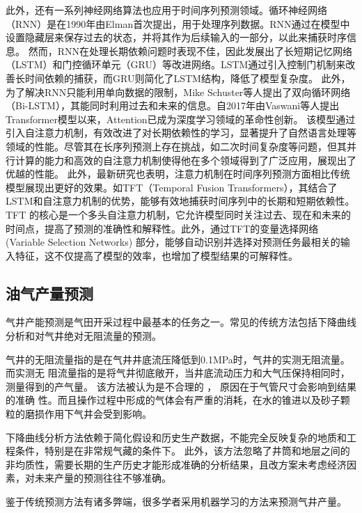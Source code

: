 此外，还有一系列神经网络算法也应用于时间序列预测领域。循环神经网络\cite{li2018independently}（RNN）是在1990年由Elman首次提出，用于处理序列数据。RNN通过在模型中设置隐藏层来保存过去的状态，并将其作为后续输入的一部分，以此来捕获时序信息。
然而，RNN在处理长期依赖问题时表现不佳，因此发展出了长短期记忆网络\cite{yu2019review}（LSTM）和门控循环单元\cite{dey2017gate}（GRU）等改进网络。LSTM通过引入控制门机制来改善长时间依赖的捕获，而GRU则简化了LSTM结构，降低了模型复杂度。
此外，为了解决RNN只能利用单向数据的限制，Mike Schuster等人提出了双向循环网络\cite{graves2005framewise}（Bi-LSTM），其能同时利用过去和未来的信息。自2017年由Vaswani等人提出Transformer模型\cite{vaswani2017attention}以来，Attention已成为深度学习领域的革命性创新。
该模型通过引入自注意力机制，有效改进了对长期依赖性的学习，显著提升了自然语言处理等领域的性能。尽管其在长序列预测上存在挑战，如二次时间复杂度等问题，但其并行计算的能力和高效的自注意力机制使得他在多个领域得到了广泛应用，展现出了优越的性能。
此外，最新研究也表明，注意力机制在时间序列预测方面相比传统模型展现出更好的效果。如TFT\cite{lim2021temporal}（Temporal Fusion Transformers），其结合了LSTM和自注意力机制的优势，能够有效地捕获时间序列中的长期和短期依赖性。
TFT 的核心是一个多头自注意力机制，它允许模型同时关注过去、现在和未来的时间点，提高了预测的准确性和解释性。此外，通过TFT的变量选择网络 (Variable Selection Networks) 部分，能够自动识别并选择对预测任务最相关的输入特征，这不仅提高了模型的效率，也增加了模型结果的可解释性。
\subsection{油气产量预测}
气井产能预测是气田开采过程中最基本的任务之一。常见的传统方法包括下降曲线分析\cite{arps1945analysis}和对气井绝对无阻流量\cite{rawlins1935back}的预测。

气井的无阻流量指的是在气井井底流压降低到0.1MPa时，气井的实测无阻流量。而实测无
阻流量指的是将气井彻底敞开，当井底流动压力和大气压保持相同时，测量得到的产气量。 该方法被认为是不合理的 ， 原因在于气管尺寸会影响到结果的准确
性。而且操作过程中形成的气体会有严重的消耗，在水的锥进以及砂子颗粒的磨损作用下气井会受到影响。

下降曲线分析方法依赖于简化假设和历史生产数据，不能完全反映复杂的地质和工程条件，特别是在非常规气藏的条件下。
此外，该方法忽略了井筒和地层之间的非均质性，需要长期的生产历史才能形成准确的分析结果，且改方案未考虑经济因素，对未来产量的预测往往不够准确。

鉴于传统预测方法有诸多弊端，很多学者采用机器学习的方法来预测气井产量。

